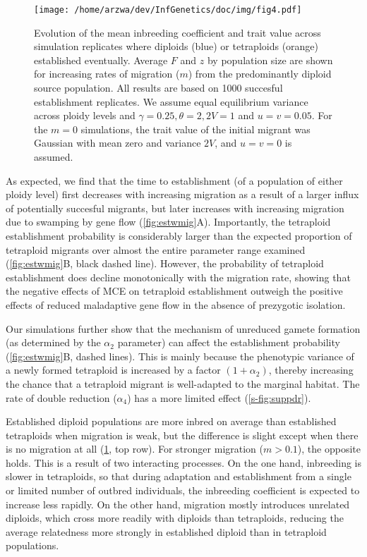 \documentclass[12pt,a4paper]{article}
\begin{document}
\begin{figure}[t]
\centering
\texttt{[image: /home/arzwa/dev/InfGenetics/doc/img/fig4.pdf]}
\caption{
    Evolution of the mean inbreeding coefficient and trait value across
    simulation replicates where diploids (blue) or tetraploids (orange)
    established eventually.
    Average $F$ and $z$ by population size are shown for increasing rates
    of migration ($m$) from the predominantly diploid source population. 
    All results are based on 1000 succesful establishment replicates.
    We assume equal equilibrium variance across ploidy levels and $\gamma=0.25,
    \theta=2, 2V=1$ and $u=v=0.05$.
    For the $m=0$ simulations, the trait value of the initial migrant was
    Gaussian with mean zero and variance $2V$, and $u=v=0$ is assumed.
\label{fig:estwmig2}}
\end{figure}

As expected, we find that the time to establishment (of a population of either
ploidy level) first decreases with increasing migration as a result of a larger
influx of potentially succesful migrants, but later increases with increasing
migration due to swamping by gene flow (\cref{fig:estwmig}A).
Importantly, the tetraploid establishment probability is considerably larger
than the expected proportion of tetraploid migrants over almost the entire
parameter range examined (\cref{fig:estwmig}B, black dashed line).
However, the probability of tetraploid establishment does decline monotonically
with the migration rate, showing that the negative effects of MCE on tetraploid
establishment outweigh the positive effects of reduced maladaptive gene flow in
the absence of prezygotic isolation.

Our simulations further show that the mechanism of unreduced gamete formation
(as determined by the $\alpha_2$ parameter) can affect the establishment
probability (\cref{fig:estwmig}B, dashed lines).
This is mainly because the phenotypic variance of a newly formed tetraploid is
increased by a factor $(1+\alpha_2)$, thereby increasing the chance that a
tetraploid migrant is well-adapted to the marginal habitat.
The rate of double reduction ($\alpha_4$) has a more limited effect
(\cref{s-fig:suppdr}).

Established diploid populations are more inbred on average than established
tetraploids when migration is weak, but the difference is slight except when
there is no migration at all (\cref{fig:estwmig2}, top row).
For stronger migration ($m > 0.1$), the opposite holds.
This is a result of two interacting processes.
On the one hand, inbreeding is slower in tetraploids, so that during adaptation
and establishment from a single or limited number of outbred individuals, 
the inbreeding coefficient is expected to increase less rapidly.
On the other hand, migration mostly introduces unrelated diploids, which cross
more readily with diploids than tetraploids, reducing the average relatedness
more strongly in established diploid than in tetraploid populations.
\end{document}
